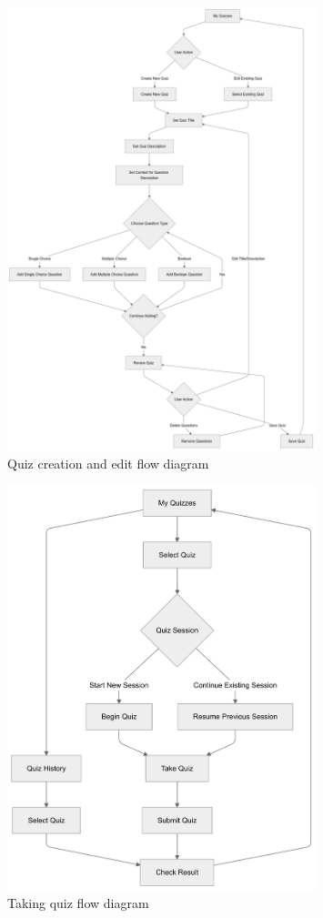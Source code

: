 \begin{figure}[H]
    \centering
    \includegraphics[width=0.8\textwidth, keepaspectratio]{figures/flow-quiz-creation-and-edit.png}
    \caption{Quiz creation and edit flow diagram}
    \label{fig:flow-quiz-creation-and-edit}
\end{figure}

\begin{figure}[H]
    \centering
    \includegraphics[width=0.8\textwidth, keepaspectratio]{figures/flow-taking-quiz.png}
    \caption{Taking quiz flow diagram}
    \label{fig:flow-taking-quiz}
\end{figure}

